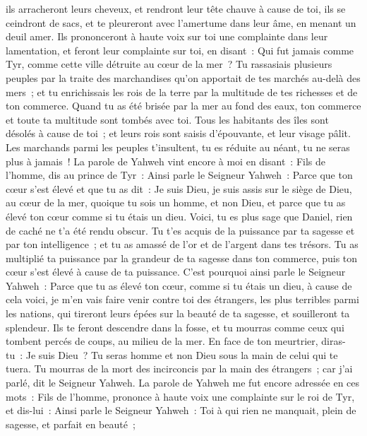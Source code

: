 \begin{multicols}{2}
ils arracheront leurs cheveux, et rendront leur tête chauve à cause de toi, ils se ceindront de sacs, et te pleureront avec l'amertume dans leur âme, en menant un deuil amer.
Ils prononceront à haute voix sur toi une complainte dans leur lamentation, et feront leur complainte sur toi, en disant~: Qui fut jamais comme Tyr, comme cette ville détruite au cœur de la mer~?
Tu rassasiais plusieurs peuples par la traite des marchandises qu'on apportait de tes marchés au-delà des mers~; et tu enrichissais les rois de la terre par la multitude de tes richesses et de ton commerce.
Quand tu as été brisée par la mer au fond des eaux, ton commerce et toute ta multitude sont tombés avec toi.
Tous les habitants des îles sont désolés à cause de toi~; et leurs rois sont saisis d'épouvante, et leur visage pâlit.
Les marchands parmi les peuples t'insultent, tu es réduite au néant, tu ne seras plus à jamais~!
\VerseOne{}La parole de Yahweh vint encore à moi en disant~:
Fils de l'homme, dis au prince de Tyr~: Ainsi parle le Seigneur Yahweh~: Parce que ton cœur s'est élevé et que tu as dit~: Je suis Dieu, je suis assis sur le siège de Dieu, au cœur de la mer, quoique tu sois un homme, et non Dieu, et parce que tu as élevé ton cœur comme si tu étais un dieu.
Voici, tu es plus sage que Daniel, rien de caché ne t'a été rendu obscur.
Tu t'es acquis de la puissance par ta sagesse et par ton intelligence~; et tu as amassé de l'or et de l'argent dans tes trésors.
Tu as multiplié ta puissance par la grandeur de ta sagesse dans ton commerce, puis ton cœur s'est élevé à cause de ta puissance.
C'est pourquoi ainsi parle le Seigneur Yahweh~: Parce que tu as élevé ton cœur, comme si tu étais un dieu,
à cause de cela voici, je m'en vais faire venir contre toi des étrangers, les plus terribles parmi les nations, qui tireront leurs épées sur la beauté de ta sagesse, et souilleront ta splendeur.
Ils te feront descendre dans la fosse, et tu mourras comme ceux qui tombent percés de coups, au milieu de la mer.
En face de ton meurtrier, diras-tu~: Je suis Dieu~? Tu seras homme et non Dieu sous la main de celui qui te tuera.
Tu mourras de la mort des incirconcis par la main des étrangers~; car j'ai parlé, dit le Seigneur Yahweh.
La parole de Yahweh me fut encore adressée en ces mots~:
Fils de l'homme, prononce à haute voix une complainte sur le roi de Tyr, et dis-lui~: Ainsi parle le Seigneur Yahweh~: Toi à qui rien ne manquait, plein de sagesse, et parfait en beauté~;

\end{multicols}
